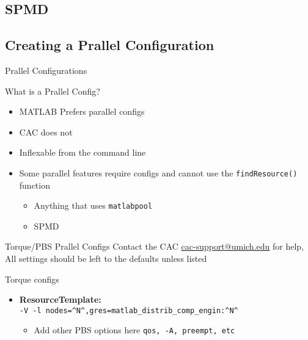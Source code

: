 \documentclass[handout]{beamer}
\begin{document}
   \subsection{SPMD}
   \subsection{Creating a Prallel Configuration}
\begin{frame}{Prallel Configurations}
\begin{block}{What is a Prallel Config?}
 \begin{itemize}
  \item MATLAB Prefers parallel configs
  \item CAC does not
  \item Inflexable from the command line
  \item Some parallel features require configs and cannot use the \texttt{findResource()} function
  \begin{itemize}
   \item Anything that uses \texttt{matlabpool}
   \item SPMD
  \end{itemize}
 \end{itemize}
\end{block}
\end{frame}

\begin{frame}{Torque/PBS Prallel Configs}
 Contact the CAC \url{cac-support@umich.edu} for help, All settings should be left to the defaults unless listed
 \begin{block}{Torque configs}
  \begin{itemize}
   \item {\bf ResourceTemplate:}\\ \texttt{-V -l nodes=\^{}N\^{},gres=matlab\_distrib\_comp\_engin:\^{}N\^{}}
    \begin{itemize}
     \item {Add other PBS options here \texttt{qos, -A, preempt, etc}}
    \end{itemize}
  \end{itemize}
 \end{block}
\end{frame}
\end{document}
